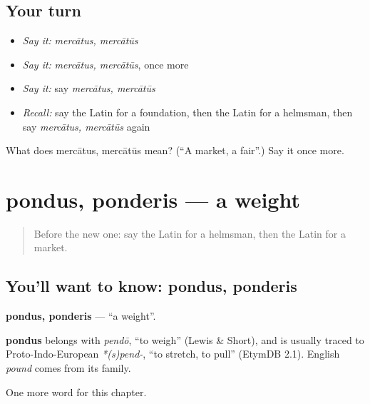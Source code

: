\subsection*{Your turn}
\begin{itemize}
\raggedright
  \item \emph{Say it:} \emph{mercātus, mercātūs}
  \item \emph{Say it:} \emph{mercātus, mercātūs}, once more
  \item \emph{Say it:} say \emph{mercātus, mercātūs}
  \item \emph{Recall:} say the Latin for a foundation, then the Latin for a helmsman, then say \emph{mercātus, mercātūs} again
\end{itemize}

\begin{tcolorbox}[breakable,colback=teal!4,colframe=teal!35!black,title={Before you move on}]
What does mercātus, mercātūs mean? (\textquotedblleft{}A market, a fair\textquotedblright{}.) Say it once more.
\end{tcolorbox}
\section[pondus, ponderis]{pondus, ponderis — a weight}

\label{lesson:LA-C186-pondus}



\begin{quote}
Before the new one: say the Latin for a helmsman, then the Latin for a market.
\end{quote}

\subsection*{You'll want to know: pondus, ponderis}
\textbf{pondus, ponderis} — \textquotedblleft{}a weight\textquotedblright{}.

\begin{cousinweb}
\textbf{pondus} belongs with \emph{pendō}, \textquotedblleft{}to weigh\textquotedblright{} (Lewis \& Short), and is usually traced to Proto-Indo-European \emph{*(s)pend-}, \textquotedblleft{}to stretch, to pull\textquotedblright{} (EtymDB 2.1). English \emph{pound} comes from its family.
\end{cousinweb}

\begin{grammarlens}[title={What you've built}]
One more word for this chapter.
\end{grammarlens}

